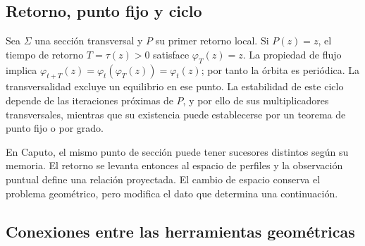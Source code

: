\subsection{Retorno, punto fijo y ciclo}

Sea \(\Sigma\) una sección transversal y \(P\) su primer retorno local.
Si \(P(z)=z\), el tiempo de retorno \(T=\tau(z)>0\) satisface
\(\varphi_T(z)=z\). La propiedad de flujo implica
\(\varphi_{t+T}(z)=\varphi_t(\varphi_T(z))=\varphi_t(z)\); por tanto
la órbita es periódica. La transversalidad excluye un equilibrio en ese
punto. La estabilidad de este ciclo depende de las iteraciones próximas de
\(P\), y por ello de sus multiplicadores transversales, mientras que su
existencia puede establecerse por un teorema de punto fijo o por grado.

En Caputo, el mismo punto de sección puede tener sucesores distintos según
su memoria. El retorno se levanta entonces al espacio de perfiles y la
observación puntual define una relación proyectada. El cambio de espacio
conserva el problema geométrico, pero modifica el dato que determina una
continuación.

\subsection{Conexiones entre las herramientas geométricas}


